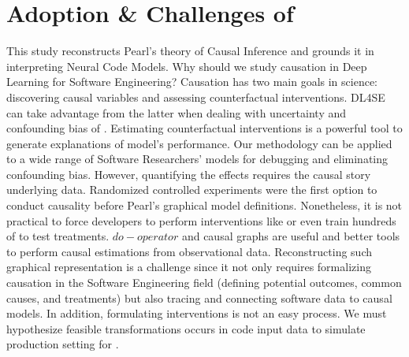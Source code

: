 \section{Adoption \& Challenges of \codegen}
\label{sec:discussion}
This study reconstructs Pearl's theory of Causal Inference and grounds it in interpreting Neural Code Models. Why should we study causation in Deep Learning for Software Engineering? Causation has two main goals in science: discovering causal variables and assessing counterfactual interventions. DL4SE can take advantage from the latter when dealing with uncertainty and confounding bias of \nlms. Estimating counterfactual interventions is a powerful tool to generate explanations of model's performance. Our methodology \codegen can be applied to a wide range of Software Researchers' models for debugging and eliminating confounding bias. However, quantifying the effects requires the causal story underlying data. Randomized controlled experiments were the first option to conduct causality before Pearl's graphical model definitions. Nonetheless, it is not practical to force developers to perform interventions like \datainterII or even train hundreds of \nlms to test treatments. $do-operator$ and causal graphs are useful and better tools to perform causal estimations from observational data. Reconstructing such graphical representation is a challenge since it not only requires formalizing causation in the Software Engineering field (\ie defining potential outcomes, common causes, and treatments) but also tracing and connecting software data to causal models. In addition, formulating interventions is not an easy process. We must hypothesize feasible transformations occurs in code input data to simulate production setting for \nlms. 


